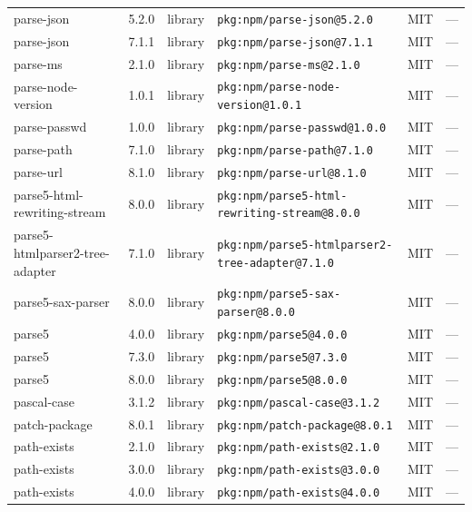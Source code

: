 \documentclass[11pt,a4paper]{article}
\begin{document}
\begin{longtable}{|p{4cm}|p{2cm}|p{1.6cm}|p{5cm}|p{1.5cm}|p{3.5cm}|}
\raggedright parse-json & 5.2.0 & library & \small\texttt{pkg:npm/parse-json@5.2.0} & MIT & \small — \\
\raggedright parse-json & 7.1.1 & library & \small\texttt{pkg:npm/parse-json@7.1.1} & MIT & \small — \\
\raggedright parse-ms & 2.1.0 & library & \small\texttt{pkg:npm/parse-ms@2.1.0} & MIT & \small — \\
\raggedright parse-node-version & 1.0.1 & library & \small\texttt{pkg:npm/parse-node-version@1.0.1} & MIT & \small — \\
\raggedright parse-passwd & 1.0.0 & library & \small\texttt{pkg:npm/parse-passwd@1.0.0} & MIT & \small — \\
\raggedright parse-path & 7.1.0 & library & \small\texttt{pkg:npm/parse-path@7.1.0} & MIT & \small — \\
\raggedright parse-url & 8.1.0 & library & \small\texttt{pkg:npm/parse-url@8.1.0} & MIT & \small — \\
\raggedright parse5-html-rewriting-stream & 8.0.0 & library & \small\texttt{pkg:npm/parse5-html-rewriting-stream@8.0.0} & MIT & \small — \\
\raggedright parse5-htmlparser2-tree-adapter & 7.1.0 & library & \small\texttt{pkg:npm/parse5-htmlparser2-tree-adapter@7.1.0} & MIT & \small — \\
\raggedright parse5-sax-parser & 8.0.0 & library & \small\texttt{pkg:npm/parse5-sax-parser@8.0.0} & MIT & \small — \\
\raggedright parse5 & 4.0.0 & library & \small\texttt{pkg:npm/parse5@4.0.0} & MIT & \small — \\
\raggedright parse5 & 7.3.0 & library & \small\texttt{pkg:npm/parse5@7.3.0} & MIT & \small — \\
\raggedright parse5 & 8.0.0 & library & \small\texttt{pkg:npm/parse5@8.0.0} & MIT & \small — \\
\raggedright pascal-case & 3.1.2 & library & \small\texttt{pkg:npm/pascal-case@3.1.2} & MIT & \small — \\
\raggedright patch-package & 8.0.1 & library & \small\texttt{pkg:npm/patch-package@8.0.1} & MIT & \small — \\
\raggedright path-exists & 2.1.0 & library & \small\texttt{pkg:npm/path-exists@2.1.0} & MIT & \small — \\
\raggedright path-exists & 3.0.0 & library & \small\texttt{pkg:npm/path-exists@3.0.0} & MIT & \small — \\
\raggedright path-exists & 4.0.0 & library & \small\texttt{pkg:npm/path-exists@4.0.0} & MIT & \small — \\

\end{longtable}
\end{document}

